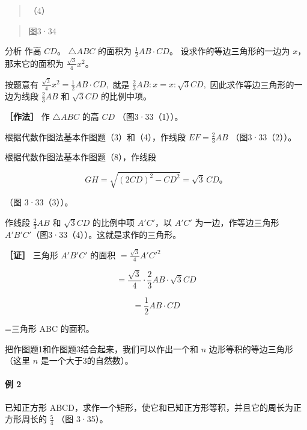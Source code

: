 \begin{quote}
（4）
\end{quote}

\begin{quote}
图3·34
\end{quote}

分析 作高 \(CD\)。 \(\triangle ABC\) 的面积为
\(\frac{1}{2} AB \cdot CD\)。 设求作的等边三角形的一边为 \(x\)，
那末它的面积为 \(\frac{\sqrt{3}}{4} x^2\)。

按题意有 \(\frac{\sqrt{3}}{4} x^2 = \frac{1}{2} AB\cdot CD,\) 就是
\(\frac{2}{3} AB: x = x: \sqrt{3} CD,\) 因此求作等边三角形的一边为线段
\(\frac{2}{3} AB\) 和 \(\sqrt{3} CD\) 的比例中项。

\textbf{［作法］} 作 \(\triangle ABC\) 的高 \(CD\) （图3·33（1））。

根据代数作图法基本作图题（3）和（4），作线段 \(EF = \frac{2}{3} AB\)
（图3·33（2））。

根据代数作图法基本作图题（8），作线段

\[
GH=\sqrt{(2CD)^2-CD^2}=\sqrt{3}\,CD\text{。}
\]

（图 3·33（3））。

作线段 \(\frac{2}{3} AB\) 和 \(\sqrt{3} CD\) 的比例中项 \(A'C'\)，以
\(A'C'\) 为一边，作等边三角形
\(A'B'C'\)（图3·33（4））。这就是求作的三角形。

\textbf{［证］} 三角形 \(A'B'C'\) 的面积 \(= \frac{\sqrt{3}}{4} A'C'^2\)

\[
= \frac {\sqrt {3}}{4} \cdot \frac {2}{3} A B \cdot \sqrt {3} C D
\]

\[
= \frac {1}{2} A B \cdot C D
\]

=三角形 ABC 的面积。

把作图题1和作图题3结合起来，我们可以作出一个和 \(n\)
边形等积的等边三角形（这里 \(n\) 是一个大于3的自然数）。

\paragraph{例 2}

已知正方形
ABCD，求作一个矩形，使它和已知正方形等积，并且它的周长为正方形周长的
\(\frac{5}{4}\) （图 3·35）。

